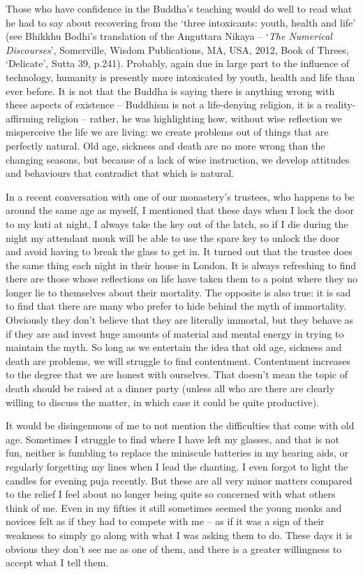 Those who have confidence in the Buddha's teaching would do well to read
what he had to say about recovering from the `three intoxicants: youth,
health and life'
(see Bhikkhu Bodhi's translation of the Anguttara Nikaya -- `\emph{The Numerical
Discourses}', Somerville, Wisdom Publications, MA, USA, 2012, Book of Threes,
`Delicate', Sutta 39, p.241).
Probably, again due in large part to the influence
of technology, humanity is presently more intoxicated by youth, health
and life than ever before. It is not that the Buddha is saying there is
anything wrong with these aspects of existence -- Buddhism is not a
life-denying religion, it is a reality-affirming religion -- rather, he
was highlighting how, without wise reflection we misperceive the life we
are living: we create problems out of things that are perfectly natural.
Old age, sickness and death are no more wrong than the changing seasons,
but because of a lack of wise instruction, we develop attitudes and
behaviours that contradict that which is natural.

In a recent conversation with one of our monastery's trustees, who
happens to be around the same age as myself, I mentioned that these days
when I lock the door to my kuti at night, I always take the key out of
the latch, so if I die during the night my attendant monk will be able
to use the spare key to unlock the door and avoid having to break the
glass to get in. It turned out that the trustee does the same thing each
night in their house in London. It is always refreshing to find there
are those whose reflections on life have taken them to a point where
they no longer lie to themselves about their mortality. The opposite is
also true: it is sad to find that there are many who prefer to hide
behind the myth of immortality. Obviously they don't believe that they
are literally immortal, but they behave as if they are and invest huge
amounts of material and mental energy in trying to maintain the myth. So
long as we entertain the idea that old age, sickness and death are
problems, we will struggle to find contentment. Contentment increases to
the degree that we are honest with ourselves. That doesn't mean the
topic of death should be raised at a dinner party (unless all who are
there are clearly willing to discuss the matter, in which case it could
be quite productive).

It would be disingenuous of me to not mention the difficulties that come
with old age. Sometimes I struggle to find where I have left my glasses,
and that is not fun, neither is fumbling to replace the miniscule
batteries in my hearing aids, or regularly forgetting my lines when I
lead the chanting. I even forgot to light the candles for evening puja
recently. But these are all very minor matters compared to the relief I
feel about no longer being quite so concerned with what others think of
me. Even in my fifties it still sometimes seemed the young monks and
novices felt as if they had to compete with me -- as if it was a sign of
their weakness to simply go along with what I was asking them to do.
These days it is obvious they don't see me as one of them, and there is
a greater willingness to accept what I tell them.

